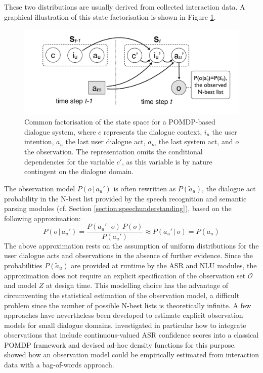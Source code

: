 These two distributions are usually derived from collected interaction data. A graphical illustration of this state factorisation is shown in Figure \ref{fig:pomdp2}. 

\begin{figure}[ht]
\centering
\includegraphics[scale=0.28]{imgs/POMDP2.pdf}
\caption{Common factorisation of the state space for a POMDP-based dialogue system, where $c$ represents the dialogue context, $i_u$ the user intention, $a_u$ the last user dialogue act, $a_m$ the last system act, and $o$ the observation. The representation omits the conditional dependencies  for the variable $c'$, as this variable is by nature contingent on the dialogue domain.}
\label{fig:pomdp2}
\end{figure}

The observation model $P(o \, | \, a_u')$ is often rewritten as $P(\tilde{a}_u)$, the dialogue act probability in the N-best list provided by the speech recognition and semantic parsing modules (cf. Section \ref{section:speechunderstanding}), based on the following approximation:
\begin{equation}
P(o \, | \, a_u') = \frac{P(a_u' \, | \, o) \ P(o)} {P(a_u')} \approx P(a_u' \, | \, o) = P(\tilde{a}_u)
\end{equation}
The above approximation rests on the assumption of uniform distributions for the user dialogue acts and observations in the absence of further evidence. Since the probabilities $P(\tilde{a}_u)$ are provided at runtime by the ASR and NLU modules, the approximation does not require an explicit specification of the observation set $\mathcal{O}$ and model $Z$ at design time.  This modelling choice has the advantage of circumventing the statistical estimation of the observation model, a difficult problem since the number of possible N-best lists is theoretically infinite. A few approaches have nevertheless been developed to estimate explicit observation models for small dialogue domains. \cite{Williamsetal:2008} investigated in particular how to integrate observations that include continuous-valued ASR confidence scores into a classical POMDP framework and devised ad-hoc density functions for this purpose.  \cite{chinaei2012} showed how an observation model could be empirically estimated from interaction data with a bag-of-words approach. 


